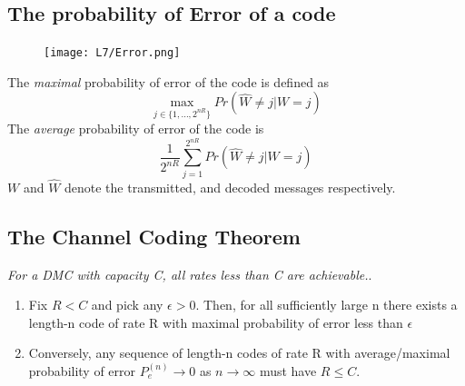 \documentclass[12pt]{article}
\begin{document}
\subsection{The probability of Error of a code}
\begin{figure}[H]
    \centering
    \texttt{[image: L7/Error.png]}
\end{figure}
The \textit{maximal} probability of error of the code is defined as 
\[
\max_{j\in \{1,...,2^{nR}\}} Pr(\hat{W}\not = j | W=j)
\]
The \textit{average} probability of error of the code is
\[
\frac{1}{2^{nR}} \sum_{j=1}^{2^{nR}} Pr(\hat{W}\not = j | W=j)
\]
$W$ and $\hat{W}$ denote the transmitted, and decoded messages respectively.

\subsection{The Channel Coding Theorem}
{\large \textit{For a DMC with capacity C, all rates less than C are achievable.}}.
\begin{enumerate}
    \item Fix $R<C$ and pick any $\epsilon > 0$. Then, for all sufficiently large n there exists a length-n code of rate R with maximal probability of error less than $\epsilon$
    \item Conversely, any sequence of length-n codes of rate R with average/maximal probability of error $P_e^{(n)} \rightarrow 0$ as $n\rightarrow \infty$ must have $R \le C$.
\end{enumerate}
\end{document}
